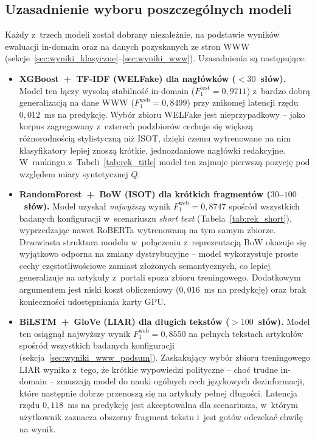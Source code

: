 \documentclass[oneside,polski,logo]{amuthesis}
\begin{document}
\subsection*{Uzasadnienie wyboru poszczególnych modeli}

Każdy z~trzech modeli został dobrany niezależnie, na podstawie
wyników ewaluacji in-domain oraz na danych pozyskanych ze stron WWW
(sekcje~\ref{sec:wyniki_klasyczne}--\ref{sec:wyniki_www}).
Uzasadnienia są następujące:

\begin{itemize}
  \item \textbf{XGBoost~+~TF-IDF (WELFake) dla nagłówków
        ($<30$~słów).} Model ten łączy wysoką stabilność in-domain
        ($F_1^{\text{test}} = 0{,}9711$) z~bardzo dobrą
        generalizacją na dane WWW
        ($F_1^{\text{web}} = 0{,}8499$) przy znikomej latencji
        rzędu \(0{,}012\)~ms na predykcję. Wybór zbioru WELFake jest
        nieprzypadkowy -- jako korpus zagregowany z~czterech
        podzbiorów cechuje się większą różnorodnością stylistyczną
        niż ISOT, dzięki czemu wytrenowane na nim klasyfikatory
        lepiej znoszą krótkie, jednozdaniowe nagłówki redakcyjne.
        W~rankingu z~Tabeli~\ref{tab:rek_title} model ten zajmuje
        pierwszą pozycję pod względem miary syntetycznej $Q$.
  \item \textbf{RandomForest~+~BoW (ISOT) dla krótkich fragmentów
        ($30$--$100$~słów).} Model uzyskał \emph{najwyższy} wynik
        $F_1^{\text{web}} = 0{,}8747$ spośród wszystkich badanych
        konfiguracji w~scenariuszu \emph{short text}
        (Tabela~\ref{tab:rek_short}), wyprzedzając nawet RoBERTa
        wytrenowaną na tym samym zbiorze. Drzewiasta struktura
        modelu w~połączeniu z~reprezentacją BoW okazuje się
        wyjątkowo odporna na zmiany dystrybucyjne -- model
        wykorzystuje proste cechy częstotliwościowe zamiast
        złożonych semantycznych, co lepiej generalizuje na artykuły
        z~portali spoza zbioru treningowego. Dodatkowym argumentem
        jest niski koszt obliczeniowy (\(0{,}016\)~ms na predykcję)
        oraz brak konieczności udostępniania karty GPU.
  \item \textbf{BiLSTM~+~GloVe (LIAR) dla długich tekstów
        ($>100$~słów).} Model ten osiągnął najwyższy wynik
        $F_1^{\text{web}} = 0{,}8550$ na pełnych tekstach artykułów
        spośród wszystkich badanych konfiguracji
        (sekcja~\ref{sec:wyniki_www_podsum}). Zaskakujący wybór
        zbioru treningowego LIAR wynika z~tego, że krótkie
        wypowiedzi polityczne -- choć trudne in-domain -- zmuszają
        model do nauki ogólnych cech językowych dezinformacji,
        które następnie dobrze przenoszą się na artykuły pełnej
        długości. Latencja rzędu \(0{,}118\)~ms na predykcję jest
        akceptowalna dla scenariusza, w~którym użytkownik
        zaznacza obszerny fragment tekstu i~jest gotów odczekać
        chwilę na wynik.
\end{itemize}
\end{document}
